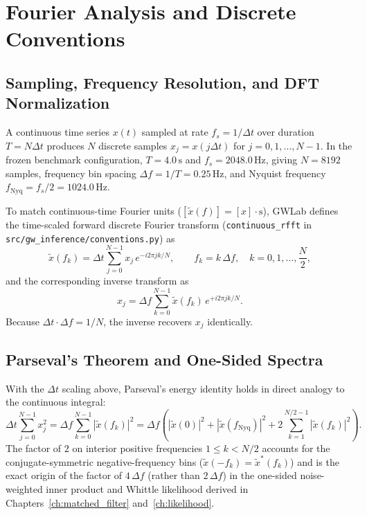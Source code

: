 \documentclass[11pt,a4paper]{report}
\begin{document}
\chapter{Fourier Analysis and Discrete Conventions}

\section{Sampling, Frequency Resolution, and DFT Normalization}
A continuous time series $x(t)$ sampled at rate $f_s = 1/\Delta t$ over duration $T = N \Delta t$ produces $N$ discrete samples $x_j = x(j\Delta t)$ for $j = 0, 1, \dots, N-1$. In the frozen benchmark configuration, $T = 4.0\,\mathrm{s}$ and $f_s = 2048.0\,\mathrm{Hz}$, giving $N = 8192$ samples, frequency bin spacing $\Delta f = 1/T = 0.25\,\mathrm{Hz}$, and Nyquist frequency $f_{\mathrm{Nyq}} = f_s / 2 = 1024.0\,\mathrm{Hz}$.

To match continuous-time Fourier units ($[\tilde{x}(f)] = [x]\cdot\mathrm{s}$), GWLab defines the time-scaled forward discrete Fourier transform (\texttt{continuous\_rfft} in \texttt{src/gw\_inference/conventions.py}) as
\begin{equation}
\tilde{x}(f_k) = \Delta t \sum_{j=0}^{N-1} x_j\,e^{-i 2\pi j k / N}, \qquad f_k = k\,\Delta f, \quad k = 0, 1, \dots, \frac{N}{2},
\end{equation}
and the corresponding inverse transform as
\begin{equation}
x_j = \Delta f \sum_{k=0}^{N-1} \tilde{x}(f_k)\,e^{+i 2\pi j k / N}.
\end{equation}
Because $\Delta t \cdot \Delta f = 1/N$, the inverse recovers $x_j$ identically.

\section{Parseval's Theorem and One-Sided Spectra}
With the $\Delta t$ scaling above, Parseval's energy identity holds in direct analogy to the continuous integral:
\begin{equation}
\Delta t \sum_{j=0}^{N-1} x_j^2 = \Delta f \sum_{k=0}^{N-1} |\tilde{x}(f_k)|^2 = \Delta f \left( |\tilde{x}(0)|^2 + |\tilde{x}(f_{\mathrm{Nyq}})|^2 + 2\sum_{k=1}^{N/2 - 1} |\tilde{x}(f_k)|^2 \right).
\end{equation}
The factor of $2$ on interior positive frequencies $1 \le k < N/2$ accounts for the conjugate-symmetric negative-frequency bins ($\tilde{x}(-f_k) = \tilde{x}^*(f_k)$) and is the exact origin of the factor of $4\,\Delta f$ (rather than $2\,\Delta f$) in the one-sided noise-weighted inner product and Whittle likelihood derived in Chapters~\ref{ch:matched_filter} and~\ref{ch:likelihood}.
\end{document}
